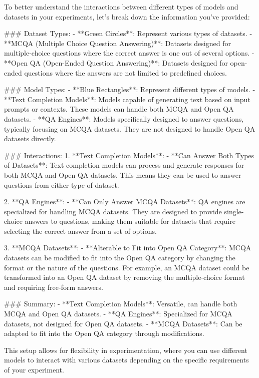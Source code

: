 To better understand the interactions between different types of models and datasets in your experiments, let's break down the information you've provided:

### Dataset Types:
- **Green Circles**: Represent various types of datasets.
  - **MCQA (Multiple Choice Question Answering)**: Datasets designed for multiple-choice questions where the correct answer is one out of several options.
  - **Open QA (Open-Ended Question Answering)**: Datasets designed for open-ended questions where the answers are not limited to predefined choices.

### Model Types:
- **Blue Rectangles**: Represent different types of models.
  - **Text Completion Models**: Models capable of generating text based on input prompts or contexts. These models can handle both MCQA and Open QA datasets.
  - **QA Engines**: Models specifically designed to answer questions, typically focusing on MCQA datasets. They are not designed to handle Open QA datasets directly.

### Interactions:
1. **Text Completion Models**:
   - **Can Answer Both Types of Datasets**: Text completion models can process and generate responses for both MCQA and Open QA datasets. This means they can be used to answer questions from either type of dataset.
   
2. **QA Engines**:
   - **Can Only Answer MCQA Datasets**: QA engines are specialized for handling MCQA datasets. They are designed to provide single-choice answers to questions, making them suitable for datasets that require selecting the correct answer from a set of options.
   
3. **MCQA Datasets**:
   - **Alterable to Fit into Open QA Category**: MCQA datasets can be modified to fit into the Open QA category by changing the format or the nature of the questions. For example, an MCQA dataset could be transformed into an Open QA dataset by removing the multiple-choice format and requiring free-form answers.

### Summary:
- **Text Completion Models**: Versatile, can handle both MCQA and Open QA datasets.
- **QA Engines**: Specialized for MCQA datasets, not designed for Open QA datasets.
- **MCQA Datasets**: Can be adapted to fit into the Open QA category through modifications.

This setup allows for flexibility in experimentation, where you can use different models to interact with various datasets depending on the specific requirements of your experiment.